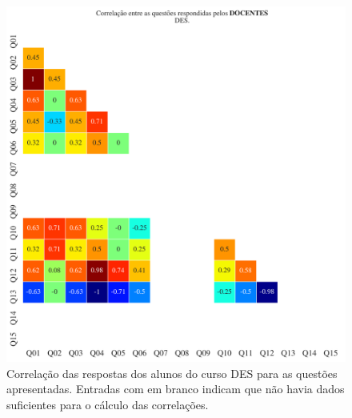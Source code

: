 \documentclass[a4paper,10pt]{article}
\begin{document}
\begin{figure}[h]
\centering
\includegraphics[width=0.999\linewidth]{matriz_corr__DES_docentes.png}
\caption{\label{fig:corr_docentes}Correlação das respostas dos alunos do curso DES para as questões apresentadas. Entradas com em branco indicam que não havia dados suficientes para o cálculo das correlações.}
\end{figure}
\end{document}
